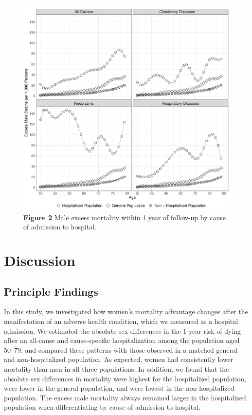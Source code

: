 	\begin{figure}[H]
		\centering
		\includegraphics[scale=0.425]{Paper_1/Paper1_Fig_2}
		\caption*{\textbf{Figure 2 } Male excess mortality within 1 year of follow-up by 
				 cause of admission to hospital.}
	\label{ch2:fig2}	
	\end{figure}

	


\section{Discussion}

\subsection{Principle Findings}
In this study, we investigated how women's mortality advantage changes 
after the manifestation of an adverse health condition, which we measured 
as a hospital admission. We estimated the absolute sex differences in 
the 1-year risk of dying after an all-cause and cause-specific hospitalization 
among the population aged 50--79, and compared these patterns with those 
observed in a matched general and non-hospitalized population. As expected, 
women had consistently lower mortality than men in all three populations. 
In addition, we found that the absolute sex differences in mortality were 
highest for the hospitalized population, were lower in the general population, 
and were lowest in the non-hospitalized population. The excess male mortality 
always remained larger in the hospitalized population when differentiating 
by cause of admission to hospital.\\

